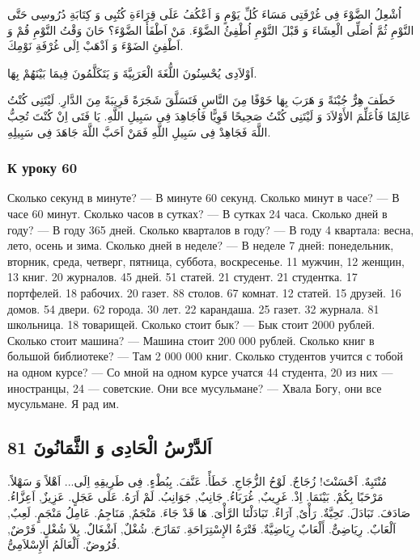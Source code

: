\documentclass[a5paper]{article}
\begin{document}
اُشْعِلُ الضَّوْءَ فِى غُرْفَتِى مَسَاءَ كُلِّ يَوْمٍ وَ اَعْكُفُ عَلَى قِرَاءَةِ كُتُبِى وَ كِتَابَةِ دُرُوسِى حَتَّى النَّوْمِ ثُمَّ اُصَلِّى الْعِشَاءَ وَ قَبْلَ النَّوْمِ اُطْفِئُ الضَّوْءَ. مَنْ اَطْفَأَ الضَّوْءَ؟ حَانَ وَقْتُ النَّوْمِ قُمْ وَ اَطْفِئِ الضَوْءَ وَ اَذْهَبْ اِلَى غُرْفَةِ نَوْمِكَ.

اَوْلاَدِى يُحْسِنُونَ اللُّغَةَ الْعَرَبِيَّةَ وَ يَتَكَلَّمُونَ فِيمَا بَيْنَهُمْ بِهَا.

خَطَفَ هِرٌّ جُبْنَةً وَ هَرَبَ بِهَا خَوْفًا مِنَ النَّاسِ فَتَسَلَّقَ شَجَرَةً قَرِيبَةً مِنَ الدَّارِ. لَيْتَنِى كُنْتُ عَالِمًا فَاُعَلِّمَ الأَوْلاَدَ وَ لَيْتَنِى كُنْتُ صَحِيحًا قَوِيًّا فَاُجَاهِدَ فِى سَبِيلِ اللَّهِ. يَا فَتَى اِنْ كُنْتَ تُحِبُّ اللَّهَ فَجَاهِدْ فِى سَبِيلِ اللَّهِ فَمَنْ اَحَبَّ اللَّهَ جَاهَدَ فِى سَبِيلِهِ.

\subsubsection[К уроку 60]{К уроку 60}
Сколько секунд в минуте? — В минуте 60 секунд. Сколько минут в часе? — В часе 60 минут. Сколько часов в сутках? — В сутках 24 часа. Сколько дней в году? — В году 365 дней. Сколько кварталов в году? — В году 4 квартала: весна, лето, осень и зима. Сколько дней в неделе? — В неделе 7 дней: понедельник, вторник, среда, четверг, пятница, суббота, воскресенье. 11 мужчин, 12 женщин, 13 книг. 20 журналов. 45 дней. 51 статей. 21 студент. 21 студентка. 17 портфелей. 18 рабочих. 20 газет. 88 столов. 67 комнат. 12 статей. 15 друзей. 16 домов. 54 двери. 62 города. 30 лет. 22 карандаша. 25 газет. 32 журнала. 81 школьница. 18 товарищей. Сколько стоит бык? — Бык стоит 2000 рублей. Сколько стоит машина? — Машина стоит 200 000 рублей. Сколько книг в большой библиотеке? — Там 2 000 000 книг. Сколько студентов учится с тобой на одном курсе? — Со мной на одном курсе учатся 44 студента, 20 из них — иностранцы, 24 — советские. Они все мусульмане? — Хвала Богу, они все мусульмане. Я рад им.

\subsection{اَلدَّرْسُ الْحَادِى وَ الثَّمَانُونَ 81}
مُنْتَبِهٌ. اَحْسَنْتَ! زُجَاجٌ. لَوْحُ الزُّجَاجِ. خَطَأً. عَنَّفَ. بِبُطْءٍ. فِى طَرِيقِهِ اِلَى... اَهْلاً وَ سَهْلاً. مَرْحَبًا بِكُمْ. بَيْنَمَا. اِذْ. غَرِيبٌ, غُرَبَاءُ. جَانِبٌ, جَوَانِبُ. لَمْ اَرَهُ. عَلَى عَجَلٍ. عَزِيزٌ, اَعِزَّاءُ. صَادَفَ. تَبَادَلَ. تَحِيَّةٌ. رَأْىٌ, آرَاءٌ. تَبَادَلْنَا الرَّأْىَ. هَا قَدْ جَاءَ. مَنْجَمٌ, مَنَاجِمُ. عَامِلُ مَنْجَمٍ. لَعِبٌ, اَلْعَابٌ. رِيَاضِىٌّ. أَلْعَابٌ رِيَاضِيَّةٌ. فَتْرَةُ الإِسْتِرَاحَةِ. تَمَازَحَ. شُغْلٌ, اَشْغَالٌ. بِلاَ شُغْلٍ. فَرْضٌ, فُرُوضٌ. اَلْعَالَمُ الإِسْلاَمِىُّ. 
\end{document}
